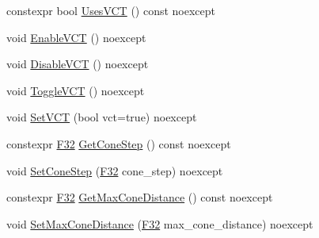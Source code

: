 \begin{DoxyCompactItemize}
\item 
constexpr bool \mbox{\hyperlink{classmage_1_1rendering_1_1_voxelization_settings_a50ce0473e8e9fd22527d4f295c023176}{Uses\+V\+CT}} () const noexcept
\item 
void \mbox{\hyperlink{classmage_1_1rendering_1_1_voxelization_settings_a1f08a9e6c02ce6c3e392cdb1ad30f75e}{Enable\+V\+CT}} () noexcept
\item 
void \mbox{\hyperlink{classmage_1_1rendering_1_1_voxelization_settings_a7092d02a0878dad9ec4fa21ce1024147}{Disable\+V\+CT}} () noexcept
\item 
void \mbox{\hyperlink{classmage_1_1rendering_1_1_voxelization_settings_a930c8f4d3723e67e8cbfc2b41533ead8}{Toggle\+V\+CT}} () noexcept
\item 
void \mbox{\hyperlink{classmage_1_1rendering_1_1_voxelization_settings_a394b58dd3d414a406fd874f7e53b211f}{Set\+V\+CT}} (bool vct=true) noexcept
\item 
constexpr \mbox{\hyperlink{namespacemage_aa97e833b45f06d60a0a9c4fc22ae02c0}{F32}} \mbox{\hyperlink{classmage_1_1rendering_1_1_voxelization_settings_aa22362a297717dc7d57c50ba5d4f814c}{Get\+Cone\+Step}} () const noexcept
\item 
void \mbox{\hyperlink{classmage_1_1rendering_1_1_voxelization_settings_a626f15dab0fa74a7b4e0435b64f0c024}{Set\+Cone\+Step}} (\mbox{\hyperlink{namespacemage_aa97e833b45f06d60a0a9c4fc22ae02c0}{F32}} cone\+\_\+step) noexcept
\item 
constexpr \mbox{\hyperlink{namespacemage_aa97e833b45f06d60a0a9c4fc22ae02c0}{F32}} \mbox{\hyperlink{classmage_1_1rendering_1_1_voxelization_settings_aa79b36e2c7ef50513548512f2cedfb6b}{Get\+Max\+Cone\+Distance}} () const noexcept
\item 
void \mbox{\hyperlink{classmage_1_1rendering_1_1_voxelization_settings_a137c4c2186b5034f546d0b876cd0633e}{Set\+Max\+Cone\+Distance}} (\mbox{\hyperlink{namespacemage_aa97e833b45f06d60a0a9c4fc22ae02c0}{F32}} max\+\_\+cone\+\_\+distance) noexcept
\end{DoxyCompactItemize}
